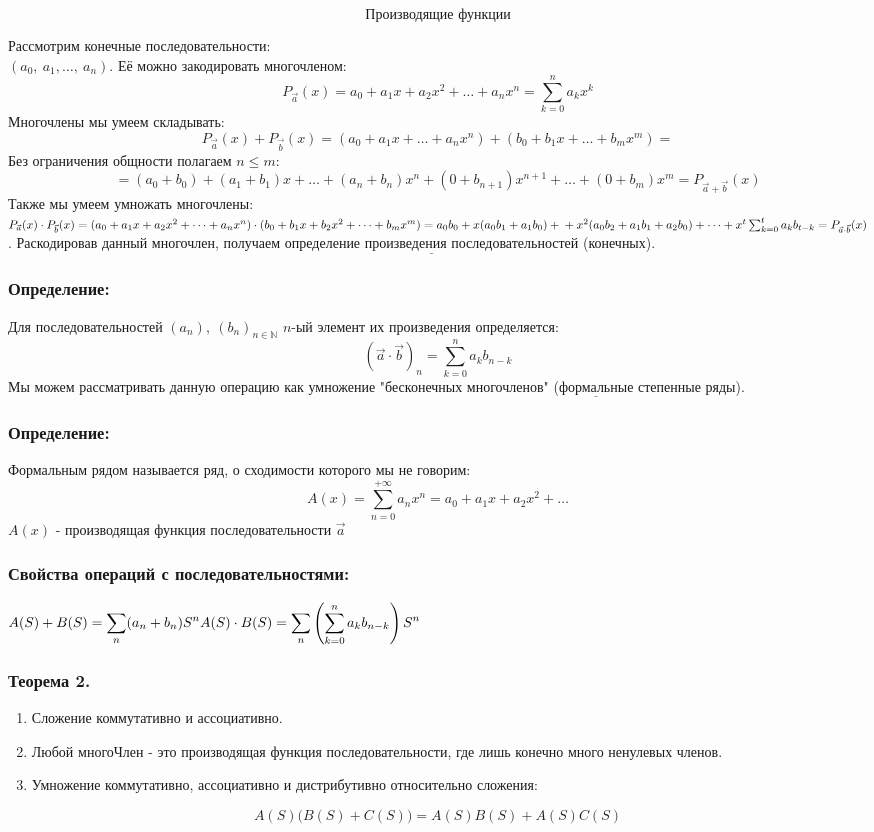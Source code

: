 \documentclass[12pt, letterpaper, twoside]{article}
\newcommand{\Underl}[1]{$\underline{\text{#1}}$}
\newcommand{\DS}{\displaystyle}
\newcommand{\oo}{\infty}
\newcommand{\mb}[1]{\mathbb{#1}}
\begin{document}
\[\textbf{Производящие функции}\]

Рассмотрим конечные последовательности:\\
$(a_0,\ a_1,\dots,\ a_n)$. Её можно закодировать многочленом:
\[P_{\vec{a}}(x) = a_0 + a_1 x + a_2 x^2 + \dots + a_n x^n = \sum_{k = 0}^{n} a_k x^k\]
Многочлены мы умеем складывать:
\[P_{\vec{a}}(x) + P_{\vec{b}}(x) = (a_0 + a_1x + \dots + a_nx^n) + (b_0 + b_1 x + \dots + b_m x^m) =\]
Без ограничения общности полагаем $n \leq m$:
\[= (a_0 + b_0) + (a_1 + b_1)x + \dots + (a_n + b_n)x^n + (0 + b_{n + 1})x^{n + 1} + \dots + (0 + b_m)x^m = P_{\vec{a} + \vec{b}}(x)\]
Также мы умеем умножать многочлены:\\
$P_{\vec{a}}(x)\cdot P_{\vec{b}}(x) = (a_0 + a_1 x + a_2 x^2+ \dots + a_n x^n)\cdot (b_0 + b_1 x + b_2 x^2 + \dots + b_m x^m) = a_0 b_0 + x(a_0 b_1 + a_1 b_0) +\\
+ x^2(a_0 b_2 + a_1 b_1 + a_2 b_0) + \dots + x^t \sum_{k = 0}^t a_k b_{t - k} = P_{\vec{a}\cdot \vec{b}}(x)$. Раскодировав данный многочлен, получаем \Underl{определение произведения последовательностей} (конечных).
\subsubsection*{Определение:}
Для последовательностей $(a_n),\ (b_n)_{n \in \mb{N}}$ $n$-ый элемент их произведения определяется:
\[\left(\vec{a}\cdot \vec{b}\right)_n = \sum_{k = 0}^{n} a_k b_{n - k}\]
Мы можем рассматривать данную операцию как умножение "бесконечных многочленов" (\Underl{формальные} степенные ряды).\\
\subsubsection*{Определение:}
Формальным рядом называется ряд, о сходимости которого мы не говорим:
\[A(x) = \sum_{n = 0}^{+\oo} a_n x^n = a_0 + a_1 x + a_2 x^2 + \dots \]
$A(x)$ - производящая функция последовательности $\vec{a}$
\subsubsection*{Свойства операций с последовательностями:}
$A(S) + B(S) = \DS\sum_n (a_n + b_n)S^n\\
A(S)\cdot B(S) = \sum_n \left( \sum_{k = 0}^na_k b_{n - k}\right)S^n$
\subsubsection*{Теорема 2.}
\begin{enumerate}
    \item Сложение коммутативно и ассоциативно.
    \item Любой многоЧлен - это производящая функция последовательности, где лишь конечно много ненулевых членов.
    \item Умножение коммутативно, ассоциативно и дистрибутивно относительно сложения:
\end{enumerate}
    \[A(S)\big(B(S) + C(S)\big) = A(S)B(S) + A(S) C(S)\]
\end{document}
